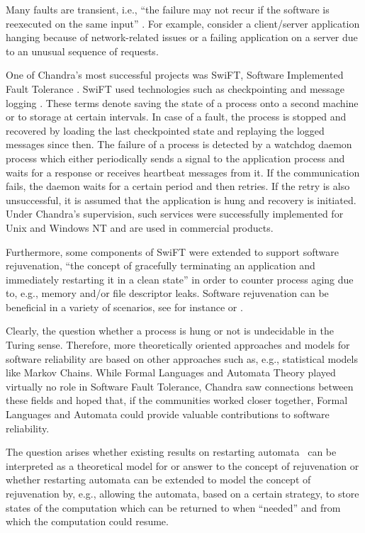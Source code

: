 \documentclass[copyright]{eptcs}
\begin{document}
Many faults are transient, i.e., ``the failure may not recur if
the software is reexecuted on the same input'' \cite{HuangK96}.  For
example, consider a client/server application hanging because of
network-related issues or a failing application on a server due to an
unusual sequence of requests.

One of Chandra's most successful projects was SwiFT, Software
Implemented Fault Tolerance \cite{HuangK93}.
SwiFT used technologies such as
checkpointing and message logging \cite{WangHVCK95}. These terms denote
saving the state of a process onto a second machine or to storage at certain
intervals. In case of a fault, the process is stopped and recovered by
loading the last checkpointed state and replaying the logged messages
since then. The failure of a process is detected by a watchdog daemon
process which either periodically sends a signal to the application
process and waits for a response or receives heartbeat messages from
it. If the communication fails, the daemon waits for a certain period
and then retries. If the retry is also unsuccessful, it is assumed
that the application is hung and recovery is initiated.  Under
Chandra's supervision, such services were successfully implemented for
Unix and Windows NT \cite{LiangCHKLTW04} and are used in commercial products.

Furthermore, some components of SwiFT were extended to support
software rejuvenation, ``the concept of gracefully terminating an
application and immediately restarting it in a clean state''
\cite{HuangKKF95} in order to counter process aging due to, e.g.,
memory and/or file descriptor leaks. Software rejuvenation can be
beneficial in a variety of scenarios, see for instance
\cite{GargHKT96} or \cite{Kintala09}.

Clearly, the question whether a process is hung or not is undecidable
in the Turing sense. Therefore, more theoretically oriented approaches
and models for software reliability are based on other approaches such
as, e.g., statistical models like Markov Chains.
While Formal Languages and Automata Theory played
virtually no role in Software Fault Tolerance,
Chandra saw
 connections between these fields and hoped that, if the communities
worked closer together, Formal Languages and Automata could
provide valuable contributions to software reliability.

The question arises whether existing results on restarting
automata~\cite{JancarMPV95,Otto03,Otto06}
can be interpreted as a theoretical model for or answer
to the concept of rejuvenation or whether restarting automata can be
extended to model the concept of rejuvenation by, e.g., allowing the
automata, based on a certain strategy, to store states of the
computation which can be returned to when ``needed'' 
and from which the
 computation could resume.
\end{document}
